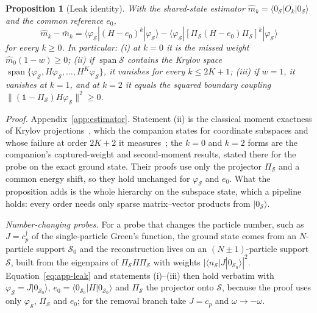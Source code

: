 \documentclass[submission, PhysCore]{SciPost}
\newcommand{\openone}{\mathds{1}}%
\newtheorem{proposition}{Proposition}
\begin{document}
\begin{proposition}[Leak identity]
\label{prop:leak}
With the shared-state estimator $\widehat m_k=\langle 0_\mathcal S|O_k|0_\mathcal S\rangle$ and the common reference $e_0$,
\begin{equation}
\widehat{m}_k-\bar m_k=\langle\varphi_\mathcal{S}|(H-e_0)^k|\varphi_\mathcal{S}\rangle-\langle\varphi_\mathcal{S}|[\Pi_\mathcal{S}(H-e_0)\Pi_\mathcal{S}]^{k}|\varphi_\mathcal{S}\rangle
\label{eq:app-leak}
\end{equation}
for every $k\ge0$. In particular: (i) at $k=0$ it is the missed weight $\widehat m_0(1-w)\ge0$; (ii) if $\operatorname{span}\mathcal S$ contains the Krylov space $\operatorname{span}\{\varphi_\mathcal S,H\varphi_\mathcal S,\dots,H^K\varphi_\mathcal S\}$, it vanishes for every $k\le2K+1$; (iii) if $w=1$, it vanishes at $k=1$, and at $k=2$ it equals the squared boundary coupling $\|(\openone-\Pi_\mathcal{S})H\varphi_\mathcal{S}\|^2\ge0$.
\end{proposition}

\noindent\emph{Proof.} Appendix~\ref{app:estimator}. Statement (ii) is the classical moment exactness of Krylov projections~\cite{Lanczos1950,GM2010}, which the companion states for coordinate subspaces and whose failure at order $2K+2$ it measures~\cite{SQDspec2608}; the $k=0$ and $k=2$ forms are the companion's captured-weight and second-moment results, stated there for the probe on the exact ground state. Their proofs use only the projector $\Pi_\mathcal S$ and a common energy shift, so they hold unchanged for $\varphi_\mathcal S$ and $e_0$. What the proposition adds is the whole hierarchy on the subspace state, which a pipeline holds: every order needs only sparse matrix--vector products from $|0_\mathcal S\rangle$.

\emph{Number-changing probes.} For a probe that changes the particle number, such as $J=c^\dagger_p$ of the single-particle Green's function, the ground state comes from an $N$-particle support $\mathcal S_0$ and the reconstruction lives on an $(N{\pm}1)$-particle support $\mathcal S$, built from the eigenpairs of $\Pi_\mathcal SH\Pi_\mathcal S$ with weights $|\langle n_\mathcal S|J|0_{\mathcal S_0}\rangle|^2$. Equation~\eqref{eq:app-leak} and statements (i)--(iii) then hold verbatim with $\varphi_\mathcal S=J|0_{\mathcal S_0}\rangle$, $e_0=\langle0_{\mathcal S_0}|H|0_{\mathcal S_0}\rangle$ and $\Pi_\mathcal S$ the projector onto $\mathcal S$, because the proof uses only $\varphi_\mathcal S$, $\Pi_\mathcal S$ and $e_0$; for the removal branch take $J=c_p$ and $\omega\to-\omega$.
\end{document}
